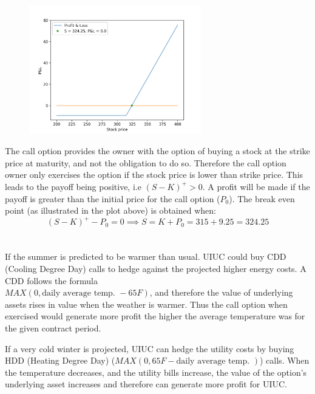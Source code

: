 \documentclass{article}
\begin{document}
\begin{figure}[H]
	\centering
	\includegraphics[width=75mm]{pl.png}
\end{figure}
The call option provides the owner with the option of buying a stock at the strike price at maturity, and not the obligation to do so. Therefore the call option owner only exercises the option if the stock price is lower than strike price. This leads to the payoff being positive, i.e $(S-K)^+ > 0$. A profit will be made if the payoff is greater than the initial price for the call option ($P_0$). The break even point (as illustrated in the plot above) is obtained when: 
$$(S-K)^+ - P_0 = 0 \implies S = K + P_0 = 315 + 9.25 = 324.25$$

\section{}

If the summer is predicted to be warmer than usual. UIUC could buy CDD (Cooling Degree Day) calls to hedge against the projected higher energy costs. A CDD follows the formula \\ 
$MAX(0, \text{daily average temp. } - 65 F)$, and therefore the value of underlying assets rises in value when the weather is warmer. Thus the call option when exercised would generate more profit the higher the average temperature was for the given contract period.

If a very cold winter is projected, UIUC can hedge the utility costs by buying HDD (Heating Degree Day) ($MAX(0, 65F - \text{daily average temp. })$) calls. When the temperature decreases, and the utility bills increase, the value of the option's underlying asset increases and therefore can generate more profit for UIUC.
\end{document}
